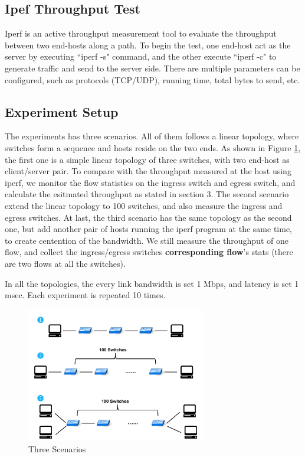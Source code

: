 \documentclass[12pt]{article}
\begin{document}
\subsection{Ipef Throughput Test}

Iperf \cite{iperf} is an active throughput measurement tool to evaluate the throughput between two end-hosts along a path. To begin the test, one end-host act as the server by executing ``iperf -s" command, and the other execute ``iperf -c" to generate traffic and send to the server side. There are multiple parameters can be configured, such as protocols (TCP/UDP), running time, total bytes to send, etc.

\subsection{Experiment Setup}

The experiments has three scenarios. All of them follows a linear topology, where switches form a sequence and hosts reside on the two ends. As shown in Figure \ref{fig:scenarios}, the first one is a simple linear topology of three switches, with two end-host as client/server pair. To compare with the throughput measured at the host using iperf, we monitor the flow statistics on the ingress switch and egress switch, and calculate the esitmated throughput as stated in section 3. The second scenario extend the linear topology to 100 switches, and also measure the ingress and egress switches. At last, the third scenario has the same topology as the second one, but add another pair of hosts running the iperf program at the same time, to create centention of the bandwidth. We still measure the throughput of one flow, and collect the ingress/egress switches \textbf{corresponding flow}'s stats (there are two flows at all the switches).

In all the topologies, the every link bandwidth is set 1 Mbps, and latency is set 1 msec. Each experiment is repeated 10 times.  

\begin{figure}
  \centering
  \includegraphics[width=0.7\textwidth]{Scenarios.pdf}
  \caption{Three Scenarios}
  \label{fig:scenarios}
\end{figure}
\end{document}
